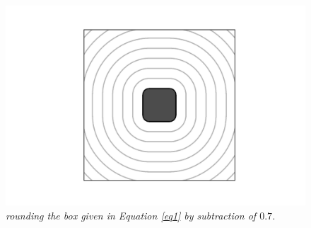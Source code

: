 \documentclass[twoside,a4paper]{article}
\begin{document}
\begin{figure}[ht]
\centerline{\includegraphics[scale=0.6]{img/sdf2dbox.png}}
\caption{\label{sdf_2d_box}{\it rounding the box given in Equation \ref{eq1} by subtraction of $0.7$.}}
\end{figure}  
\end{document}
